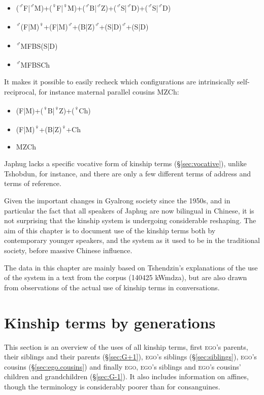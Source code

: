 \begin{itemize}
\item (\textsuperscript{♂}F|\textsuperscript{♂}M)+(\textsuperscript{♀}F|\textsuperscript{♀}M)+(\textsuperscript{♂}B|\textsuperscript{♂}Z)+(\textsuperscript{♂}S|\textsuperscript{♂}D)+(\textsuperscript{♂}S|\textsuperscript{♂}D)
\item \textsuperscript{♂}(F|M)\textsuperscript{♀}+(F|M)\textsuperscript{♂}+(B|Z)\textsuperscript{♂}+(S|D)\textsuperscript{♂}+(S|D)
\item \textsuperscript{♂}MFBS(S|D)
\item \textsuperscript{♂}MFBSCh
\end{itemize}
 
It makes it possible to easily recheck which configurations are intrinsically self-reciprocal, for instance maternal parallel cousins MZCh:

 \begin{itemize}
\item (F|M)+(\textsuperscript{♀}B|\textsuperscript{♀}Z)+(\textsuperscript{♀}Ch)
\item (F|M)\textsuperscript{♀}+(B|Z)\textsuperscript{♀}+Ch
\item MZCh
\end{itemize}
 

Japhug lacks a specific vocative form of kinship terms (§\ref{sec:vocative}), unlike Tshobdun, \citet[133]{jackson98morphology} for instance, and there are only a few different terms of address and terms of reference.

Given the important changes in Gyalrong society since the 1950s, and in particular the fact that all speakers of Japhug are now bilingual in Chinese, it is not surprising that the kinship system is undergoing considerable reshaping. The aim of this chapter is to document use of the kinship terms both by contemporary younger speakers, and the system as it used to be in the traditional society, before massive Chinese influence.

The data in this chapter are mainly based on Tshendzin's explanations of the use of the system in a text from the corpus (140425 kWmdza), but are also drawn from observations of the actual use of kinship terms in conversations.
 
 \section{Kinship terms by generations}  
 This section is an overview of the uses of all kinship terms, first  \textsc{ego}'s parents,  their siblings and their parents (§\ref{sec:G+1}), \textsc{ego}'s siblings (§\ref{sec:siblings}), \textsc{ego}'s cousins (§\ref{sec:ego.cousins}) and finally  \textsc{ego}, \textsc{ego}'s siblings and \textsc{ego}'s cousins' children and grandchildren (§\ref{sec:G-1}). It also includes information on affines, though the terminology is considerably poorer than for consanguines.
 
